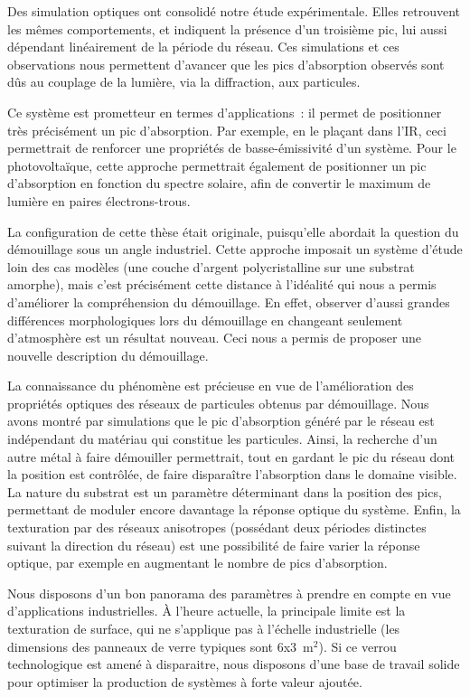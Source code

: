 Des simulation optiques ont consolidé notre étude expérimentale. Elles retrouvent les mêmes comportements, et indiquent la présence d'un troisième pic, lui aussi dépendant linéairement de la période du réseau. Ces simulations et ces observations nous permettent d'avancer que les pics d'absorption observés sont dûs au couplage de la lumière, via la diffraction, aux particules.\par 
Ce système est prometteur en termes d'applications~: il permet de positionner très précisément un pic d'absorption. Par exemple, en le plaçant dans l'IR, ceci permettrait de renforcer une propriétés de basse-émissivité d'un système. Pour le photovoltaïque, cette approche permettrait également de positionner un pic d'absorption en fonction du spectre solaire, afin de convertir le maximum de lumière en paires électrons-trous.\par 
\vspace{12pt}
La configuration de cette thèse était originale, puisqu'elle abordait la question du démouillage sous un angle industriel. Cette approche imposait un système d'étude loin des cas modèles (une couche d'argent polycristalline sur une substrat amorphe), mais c'est précisément cette distance à l'idéalité qui nous a permis d'améliorer la compréhension du démouillage. En effet, observer d'aussi grandes différences morphologiques lors du démouillage en changeant seulement d'atmosphère est un résultat nouveau. Ceci nous a permis de proposer une nouvelle description du démouillage.\par 
La connaissance du phénomène est précieuse en vue de l'amélioration des propriétés optiques des réseaux de particules obtenus par démouillage. Nous avons montré par simulations que le pic d'absorption généré par le réseau est indépendant du matériau qui constitue les particules. Ainsi, la recherche d'un autre métal à faire démouiller permettrait, tout en gardant le pic du réseau dont la position est contrôlée, de faire disparaître l'absorption dans le domaine visible. La nature du substrat est un paramètre déterminant dans la position des pics, permettant de moduler encore davantage la réponse optique du système. Enfin, la texturation par des réseaux anisotropes (possédant deux périodes distinctes suivant la direction du réseau) est une possibilité de faire varier la réponse optique, par exemple en augmentant le nombre de pics d'absorption.\par 
Nous disposons d'un bon panorama des paramètres à prendre en compte en vue d'applications industrielles. À l'heure actuelle, la principale limite est la texturation de surface, qui ne s'applique pas à l'échelle industrielle (les dimensions des panneaux de verre typiques sont 6x3~m$^2$). Si ce verrou technologique est amené à disparaitre, nous disposons d'une base de travail solide pour optimiser la production de systèmes à forte valeur ajoutée.\par 

